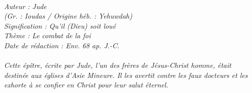\BFont
\noindent\hrulefill
{\footnotesize
\textit{
\bigskip
{\centering{}
\\Auteur : Jude
\\(Gr. : Ioudas / Origine héb. : Yehuwdah)
\\Signification : Qu'il (Dieu) soit loué
\\Thème : Le combat de la foi
\\Date de rédaction : Env. 68 ap. J.-C.\\}
}
\textit{
\\Cette épître, écrite par Jude, l'un des frères de Jésus-Christ homme, était destinée aux églises d'Asie Mineure. Il les avertit contre les faux docteurs et les exhorte à se confier en Christ pour leur salut éternel.\bigskip
}
}
\par\nobreak\noindent\hrulefill
